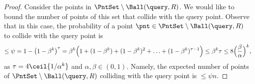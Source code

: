 \begin{proof} 
    Consider the points in $\PntSet \setminus \Ball(\query, R)$. We
    would like to bound the number of points of this set that collide
    with the query point.  Observe that in this case, the probability
    of a point $\pnt \in \PntSet \setminus \Ball(\query, R)$ to
    collide with the query point is
    \begin{equation*}
        \leq%
        \psi%
        =%
        1-\bigl(1-\beta^k\bigr)^\tau%
        =%
        \beta^k
        \Bigl( 1 + (1-\beta^k) +
        (1-\beta^k)^2 + \ldots + (1-\beta^k)^{\tau - 1}
        \Bigr)
      \leq%
      \beta^k \tau%
      \leq%
      8 \Bigl(\frac{\beta}{\alpha}\Bigr)^k,        
    \end{equation*}
    as $\tau = 4\ceil{1/\alpha^k}$ and $\alpha,\beta\in (0,1)$.
    Namely, the expected number of points of $\PntSet \setminus
    \Ball(\query, R)$ colliding with the query point is $\leq \psi n$.
\end{proof}


